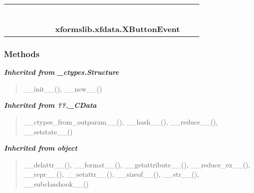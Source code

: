     \label{xformslib:xfdata:XButtonEvent}
\begin{tabular}{cccccccccc}
\multicolumn{2}{r}{\settowidth{\BCL}{object}\multirow{2}{\BCL}{object}}
&&
&&
&&
  \\\cline{3-3}
  &&\multicolumn{1}{c|}{}
&&
&&
&&
  \\
\multicolumn{4}{r}{\settowidth{\BCL}{??.\_CData}\multirow{2}{\BCL}{??.\_CData}}
&&
&&
  \\\cline{5-5}
  &&&&\multicolumn{1}{c|}{}
&&
&&
  \\
\multicolumn{6}{r}{\settowidth{\BCL}{\_ctypes.Structure}\multirow{2}{\BCL}{\_ctypes.Structure}}
&&
  \\\cline{7-7}
  &&&&&&\multicolumn{1}{c|}{}
&&
  \\
&&&&&&\multicolumn{2}{l}{\textbf{xformslib.xfdata.XButtonEvent}}
\end{tabular}



  \subsubsection{Methods}


\large{\textbf{\textit{Inherited from \_ctypes.Structure}}}

\begin{quote}
\_\_init\_\_(), \_\_new\_\_()
\end{quote}

\large{\textbf{\textit{Inherited from ??.\_CData}}}

\begin{quote}
\_\_ctypes\_from\_outparam\_\_(), \_\_hash\_\_(), \_\_reduce\_\_(), \_\_setstate\_\_()
\end{quote}

\large{\textbf{\textit{Inherited from object}}}

\begin{quote}
\_\_delattr\_\_(), \_\_format\_\_(), \_\_getattribute\_\_(), \_\_reduce\_ex\_\_(), \_\_repr\_\_(), \_\_setattr\_\_(), \_\_sizeof\_\_(), \_\_str\_\_(), \_\_subclasshook\_\_()
\end{quote}


